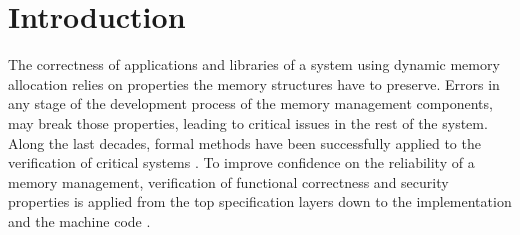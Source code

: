 \section{Introduction}
The correctness of applications and libraries of a system using dynamic memory allocation relies on properties the memory structures have to preserve. Errors in any stage of the development process of the memory management components, may break those properties, leading to critical issues in the rest of the system. Along the last decades, formal methods have been successfully applied to the verification of critical systems  . To improve confidence on the reliability of a memory management, verification of functional correctness and security properties is applied from the top specification layers down to the implementation and the machine code .

